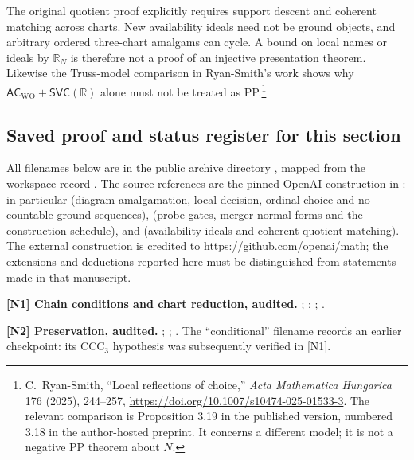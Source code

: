 The original quotient proof explicitly requires support descent and
coherent matching across charts.  New availability ideals need not
be ground objects, and arbitrary ordered three-chart amalgams can
cycle.  A bound on local names or ideals by $\mathbb R_N$ is therefore
not a proof of an injective presentation theorem.  Likewise the
Truss-model comparison in Ryan-Smith's work shows why
$\mathsf{AC}_{\mathrm{WO}}+\mathsf{SVC}(\mathbb R)$ alone must not be
treated as PP.\footnote{C.~Ryan-Smith, ``Local reflections of choice,''
\emph{Acta Mathematica Hungarica} 176 (2025), 244--257,
\url{https://doi.org/10.1007/s10474-025-01533-3}.
The relevant comparison is Proposition 3.19 in the published version,
numbered 3.18 in the author-hosted preprint.  It concerns a different
model; it is not a negative PP theorem about $N$.}

\subsection*{Saved proof and status register for this section}

All filenames below are in the public archive directory
, mapped from the workspace record
.  The source references are
the pinned OpenAI construction in : in
particular  (diagram amalgamation, local decision,
ordinal choice and no countable ground sequences), 
(probe gates, merger normal forms and the construction schedule), and
 (availability ideals and coherent quotient
matching).  The external construction is credited to
\url{https://github.com/openai/math}; the extensions and deductions
reported here must be distinguished from statements made in that
manuscript.

\begingroup\small
\noindent\textbf{[N1] Chain conditions and chart reduction, audited.}
;
;
;
.

\noindent\textbf{[N2] Preservation, audited.}
;
;
.
The ``conditional'' filename records an earlier checkpoint: its
$\mathrm{CCC}_3$ hypothesis was subsequently verified in [N1].

